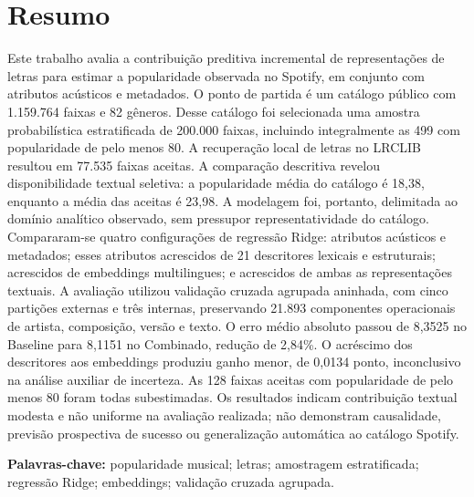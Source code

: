 \section*{Resumo}
Este trabalho avalia a contribuição preditiva incremental de representações de letras para estimar a popularidade observada no Spotify, em conjunto com atributos acústicos e metadados. O ponto de partida é um catálogo público com 1.159.764 faixas e 82 gêneros. Desse catálogo foi selecionada uma amostra probabilística estratificada de 200.000 faixas, incluindo integralmente as 499 com popularidade de pelo menos 80. A recuperação local de letras no LRCLIB resultou em 77.535 faixas aceitas. A comparação descritiva revelou disponibilidade textual seletiva: a popularidade média do catálogo é 18,38, enquanto a média das aceitas é 23,98. A modelagem foi, portanto, delimitada ao domínio analítico observado, sem pressupor representatividade do catálogo. Compararam-se quatro configurações de regressão Ridge: atributos acústicos e metadados; esses atributos acrescidos de 21 descritores lexicais e estruturais; acrescidos de embeddings multilingues; e acrescidos de ambas as representações textuais. A avaliação utilizou validação cruzada agrupada aninhada, com cinco partições externas e três internas, preservando 21.893 componentes operacionais de artista, composição, versão e texto. O erro médio absoluto passou de 8,3525 no Baseline para 8,1151 no Combinado, redução de 2,84\%. O acréscimo dos descritores aos embeddings produziu ganho menor, de 0,0134 ponto, inconclusivo na análise auxiliar de incerteza. As 128 faixas aceitas com popularidade de pelo menos 80 foram todas subestimadas. Os resultados indicam contribuição textual modesta e não uniforme na avaliação realizada; não demonstram causalidade, previsão prospectiva de sucesso ou generalização automática ao catálogo Spotify.

\vspace{.6cm}
{\raggedright\noindent\textbf{Palavras-chave:} popularidade musical; letras; amostragem estratificada; regressão Ridge; embeddings; validação cruzada agrupada.\par}
